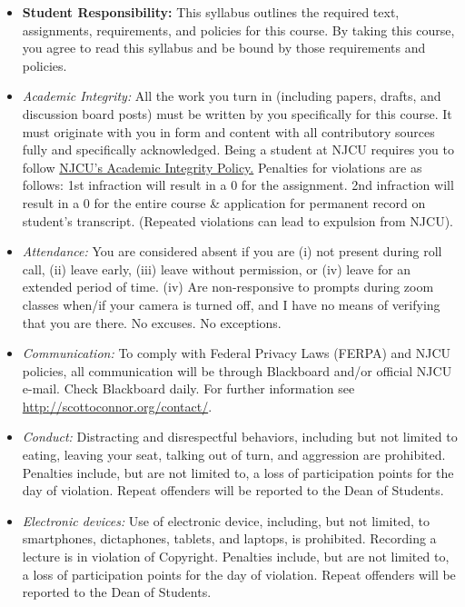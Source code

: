 \documentclass[article,oneside]{memoir}
\begin{document}
\begin{itemize}

\item \textbf{Student Responsibility:} This syllabus outlines the required text, assignments, requirements, and policies for this course. By taking this course, you agree to read this syllabus and be bound by those requirements and policies. 

 \item \textit{Academic Integrity:} All the work you turn in (including papers, drafts, and discussion board posts) must be written by you specifically for this course. It must originate with you in form and content with all contributory sources fully and specifically acknowledged. Being a student at NJCU requires you to follow \href{http://scottoconnor.org/resources/Plagiarism.pdf}{NJCU's Academic Integrity Policy.} Penalties for violations are as follows: 1st infraction will result in a 0 for the assignment.  2nd infraction will result in a 0 for the entire course \& application for permanent record on student's transcript. (Repeated violations can lead to expulsion from NJCU). 

\item \textit{Attendance:} You are considered absent if you are (i) not present during roll call, (ii) leave early, (iii) leave without permission, or (iv) leave for an extended period of time. (iv) Are non-responsive to prompts during zoom classes when/if your camera is turned off, and I have no means of verifying that you are there. No excuses. No exceptions.



\item \textit{Communication:} To comply with Federal Privacy Laws (FERPA) and NJCU policies, all communication will be through Blackboard and/or official NJCU e-mail. Check Blackboard daily. For further information see \href{http://scottoconnor.org/contact/}{http://scottoconnor.org/contact/}.

\item \textit{Conduct:} Distracting and disrespectful behaviors, including but not limited to eating, leaving your seat, talking out of turn, and aggression are prohibited. Penalties include, but are not limited to, a loss of participation points for the day of violation. Repeat offenders will be reported to the Dean of Students. 

\item \textit{Electronic devices:} Use of electronic device, including, but not limited, to smartphones, dictaphones, tablets, and laptops, is prohibited. Recording a lecture is in violation of Copyright. Penalties include, but are not limited to, a loss of participation points for the day of violation. Repeat offenders will be reported to the Dean of Students.


\end{itemize}
\end{document}
